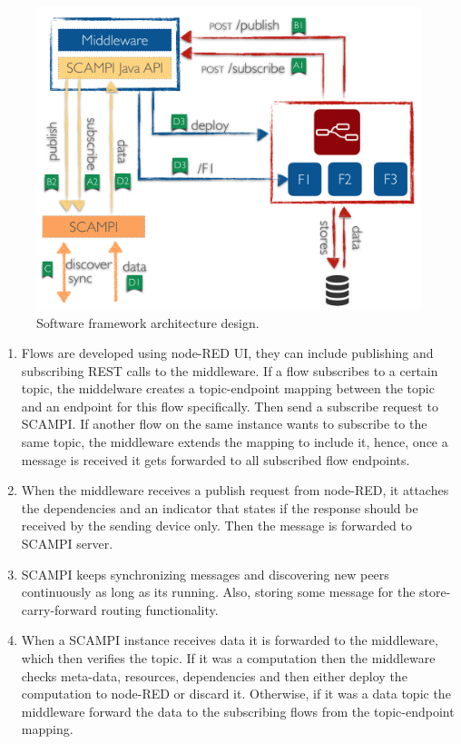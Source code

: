 \begin{figure}[H]
	\centering
	\includegraphics[scale=0.5]{images/design.png}
	\caption{Software framework architecture design. }
	\label{fig:design}
\end{figure}

\begin{enumerate}[label=(\Alph*)]
 
 \item Flows are developed using node-RED UI, they can include publishing and subscribing REST calls to the middleware. If a flow subscribes to a certain topic, the middelware creates  a topic-endpoint mapping between the topic and an endpoint for this flow specifically. Then send a subscribe request to SCAMPI. If another flow on the same instance wants to subscribe to the same topic, the middleware extends the mapping to include it, hence, once a message is received it gets forwarded to all subscribed flow endpoints. 

 \item When the middleware receives a publish request from node-RED, it attaches the dependencies and an indicator that states if the response should be received by the sending device only. Then the message is forwarded to SCAMPI server.

 \item SCAMPI keeps synchronizing messages and discovering new peers continuously as long as its running. Also, storing some message for the store-carry-forward routing functionality.

 \item When a SCAMPI instance receives data it is forwarded to the middleware, which then verifies the topic. If it was a computation then the middleware  checks meta-data, resources, dependencies and then either deploy the computation to node-RED or discard it. Otherwise, if it was a data topic the middleware forward the data to the subscribing flows from the topic-endpoint mapping. 

\end{enumerate}

